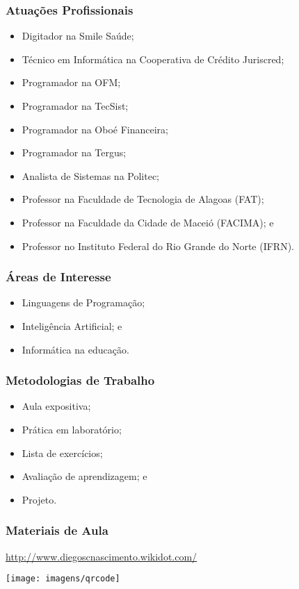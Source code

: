 \documentclass[aspectratio=169]{beamer}
\begin{document}
\begin{frame}
	\frametitle{Atuações Profissionais}

	\begin{itemize}
		\item Digitador na Smile Saúde;
		\item Técnico em Informática na Cooperativa de Crédito Juriscred;
		\item Programador na OFM;		
		\item Programador na TecSist;
		\item Programador na Oboé Financeira;
		\item Programador na Tergus;
		\item Analista de Sistemas na Politec;
		\item Professor na Faculdade de Tecnologia de Alagoas (FAT);
		\item Professor na Faculdade da Cidade de Maceió (FACIMA); e
		\item Professor no Instituto Federal do Rio Grande do Norte (IFRN).		
	\end{itemize}
\end{frame}

\begin{frame}
	\frametitle{Áreas de Interesse}
	
	\begin{itemize}
        		\item Linguagens de Programação;
		\item Inteligência Artificial; e
		\item Informática na educa\c cão.
	\end{itemize}
\end{frame}

\begin{frame}
	\frametitle{Metodologias de Trabalho}
	
	\begin{itemize}
		\item Aula expositiva;
		\item Prática em laboratório;
		\item Lista de exercícios;
	    	\item Avalia\c cão de aprendizagem; e 
		\item Projeto.
	\end{itemize}
\end{frame}

\begin{frame}
	\frametitle{Materiais de Aula}

\center
	\url{http://www.diegoscnascimento.wikidot.com/} \vfill

	\texttt{[image: imagens/qrcode]}
\end{frame}
\end{document}
